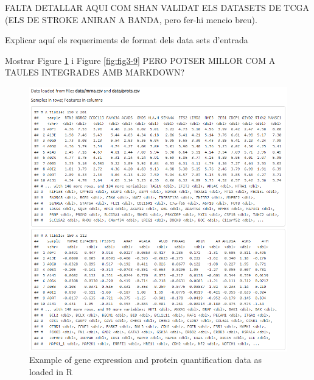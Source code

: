 \documentclass[a4paper, nobind]{templates/ociamthesis}
\begin{document}
FALTA DETALLAR AQUI COM SHAN VALIDAT ELS DATASETS DE TCGA (ELS DE STROKE ANIRAN A BANDA, pero fer-hi mencio breu).

Explicar aquí els requeriments de format dels data sets d'entrada

Mostrar Figure \ref{fig:fig3-10} i Figure \ref{fig:fig3-9} PERO POTSER MILLOR COM A TAULES INTEGRADES AMB MARKDOWN?

\begin{figure}

{\centering \includegraphics[width=0.95\linewidth]{figures/chapter3/3-10_input_data_R_example} 

}

\caption[Example of gene and protein data loaded in R]{Example of gene expression and protein quantification data as loaded in R}\label{fig:fig3-10}
\end{figure}
\end{document}
